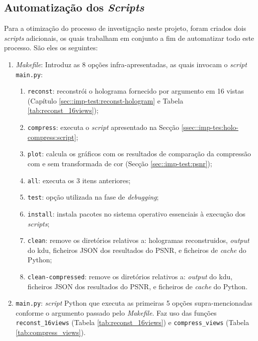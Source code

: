 \subsection{Automatização dos \textit{Scripts}}
\label{ssec::imp-test:holo-compress:auto-script}

Para a otimização do processo de investigação neste projeto, foram criados dois \textit{scripts} adicionais, os quais trabalham em conjunto a fim de automatizar todo este processo. São eles os seguintes:
\begin{enumerate}
    \item \textit{Makefile}: Introduz as 8 opções infra-apresentadas, as quais invocam o \textit{script} \verb|main.py|: 
        \begin{enumerate}
            \item \verb|reconst|: reconstrói o holograma fornecido por argumento em 16 vistas (Capítulo \ref{sec::imp-test:reconst-hologram} e Tabela \ref{tab:reconst_16views});
            \item \verb|compress|: executa o \textit{script} apresentado na Secção \ref{ssec::imp-tes:holo-compress:script};
            \item \verb|plot|: calcula os gráficos com os resultados de comparação da   compressão com e sem transformada de cor (Secção \ref{sec::imp-test:psnr});
            \item \verb|all|: executa os 3 itens anteriores;
            \item \verb|test|: opção utilizada na fase de \textit{debugging};
            \item \verb|install|: instala pacotes no sistema operativo essenciais à execução dos \textit{scripts};
            \item \verb|clean|: remove os diretórios relativos a: hologramas reconstruidos, \textit{output} do \ac{kdu}, ficheiros \ac{JSON} dos resultados do \ac{PSNR}, e ficheiros de \textit{cache} do Python;
            \item \verb|clean-compressed|: remove os diretórios relativos a: \textit{output} do \ac{kdu}, ficheiros \ac{JSON} dos resultados do \ac{PSNR}, e ficheiros de \textit{cache} do Python.
        \end{enumerate}
    \item \verb|main.py|: \textit{script} Python que executa as primeiras 5 opções supra-mencionadas conforme o argumento passado pelo \textit{Makefile}. Faz uso das funções \verb|reconst_16views| (Tabela \ref{tab:reconst_16views}) e \verb|compress_views| (Tabela \ref{tab:compress_views}).
\end{enumerate}


